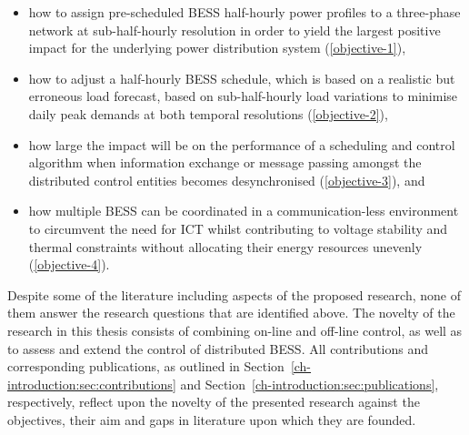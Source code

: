 \begin{itemize}
	\item how to assign pre-scheduled BESS half-hourly power profiles to a three-phase network at sub-half-hourly resolution in order to yield the largest positive impact for the underlying power distribution system (\ref{objective-1}),
	\item how to adjust a half-hourly BESS schedule, which is based on a realistic but erroneous load forecast, based on sub-half-hourly load variations to minimise daily peak demands at both temporal resolutions (\ref{objective-2}),
	\item how large the impact will be on the performance of a scheduling and control algorithm when information exchange or message passing amongst the distributed control entities becomes desynchronised (\ref{objective-3}), and
	\item how multiple BESS can be coordinated in a communication-less environment to circumvent the need for ICT whilst contributing to voltage stability and thermal constraints without allocating their energy resources unevenly (\ref{objective-4}).
\end{itemize}

Despite some of the literature including aspects of the proposed research, none of them answer the research questions that are identified above.
The novelty of the research in this thesis consists of combining on-line and off-line control, as well as to assess and extend the control of distributed BESS.
All contributions and corresponding publications, as outlined in Section~\ref{ch-introduction:sec:contributions} and Section~\ref{ch-introduction:sec:publications}, respectively, reflect upon the novelty of the presented research against the objectives, their aim and gaps in literature upon which they are founded.
